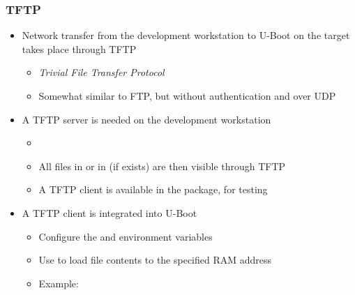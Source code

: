 \begin{frame}
  \frametitle{TFTP}
  \begin{itemize}
  \item Network transfer from the development workstation to U-Boot
    on the target takes place through TFTP
    \begin{itemize}
    \item {\em Trivial File Transfer Protocol}
    \item Somewhat similar to FTP, but without authentication and over
      UDP
    \end{itemize}
  \item A TFTP server is needed on the development workstation
    \begin{itemize}
    \item {}
    \item All files in  or in 
      (if  exists) are then visible through TFTP
    \item A TFTP client is available in the  package,
      for testing
    \end{itemize}
  \item A TFTP client is integrated into U-Boot
    \begin{itemize}
    \item Configure the  and  environment
      variables
    \item Use  to load file contents to
      the specified RAM address
    \item Example: 
    \end{itemize}
  \end{itemize}
\end{frame}
